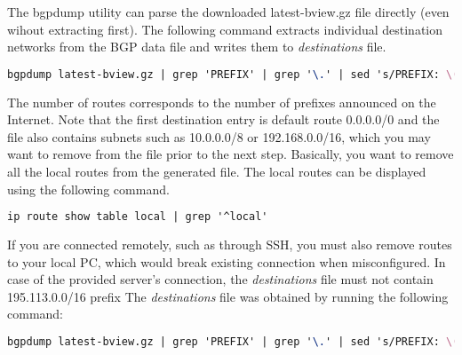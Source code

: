 The bgpdump utility can parse the downloaded latest-bview.gz file directly (even wihout extracting first).
The following command extracts individual destination networks from the BGP data file and writes them to {\it{destinations}} file.
\begin{lstlisting}[language=TeX]
bgpdump latest-bview.gz | grep 'PREFIX' | grep '\.' | sed 's/PREFIX: \(.*\)/\1/' | uniq > destinations
\end{lstlisting}
The number of routes corresponds to the number of prefixes announced on the Internet.
Note that the first destination entry is default route 0.0.0.0/0 and the file also contains subnets such as 10.0.0.0/8 or 192.168.0.0/16,
which you may want to remove from the file prior to the next step.
Basically, you want to remove all the local routes from the generated file.
The local routes can be displayed using the following command.
\begin{lstlisting}[language=TeX]
ip route show table local | grep '^local'
\end{lstlisting}
If you are connected remotely, such as through SSH,
you must also remove routes to your local PC, which would break existing connection when misconfigured.
In case of the provided server's connection, the {\it{destinations}} file must not contain 195.113.0.0/16 prefix
The {\it{destinations}} file was obtained by running the following command:
\begin{lstlisting}[language=TeX]
bgpdump latest-bview.gz | grep 'PREFIX' | grep '\.' | sed 's/PREFIX: \(.*\)/\1/' | grep -v '195.113.0.0/16' uniq > destinations
\end{lstlisting}

